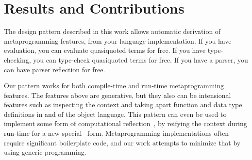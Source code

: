 \documentclass[format=acmsmall, review=false, screen=true]{acmart}
\begin{document}
\section{Results and Contributions}

The design pattern described in this work allows automatic derivation of metaprogramming features, from your language implementation.
If you have evaluation, you can evaluate quasiquoted terms for free.
If you have type-checking, you can type-check quasiquoted terms for free.
If you have a parser, you can have parser reflection for free.

Our pattern works for both compile-time and run-time metaprogramming features.
The features above are generative, but they also can be intensional features
such as inspecting the context and taking apart function and data type
definitions in and of the object language. This pattern can even be used to
implement some form of computational
reflection~\cite{bcSmith,reflectionMasses}, by reifying the context during
run-time for a new special \textlambda\ form.
Metaprogramming implementations often require significant boilerplate code, and
our work attempts to minimize that by using generic programming.






\end{document}
